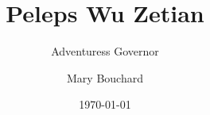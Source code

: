 ﻿\documentclass[10pt,twocolumn,twoside]{book}
\title{Peleps Wu Zetian}
\subtitle{Adventuress Governor}
\author{Mary Bouchard}
\date{\ddmmmyyyydate\today}
\begin{document}
\frontmatter
{}
\pagestyle{empty}

\begin{titlepage}
    \MakeExaltedTitle
\end{titlepage}

\cleardoublepage



\mainmatter
\pagestyle{main}




\end{document}
